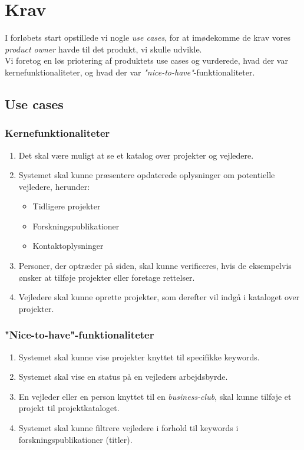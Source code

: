 \documentclass[12pt]{article}
\begin{document}
\section{Krav}
\label{sec:krav}
I forløbets start opstillede vi nogle \textit{use cases}, for at imødekomme de krav vores \textit{product owner} havde til det produkt, vi skulle udvikle. \\
Vi foretog en løs priotering af produktets use cases og vurderede, hvad der var kernefunktionaliteter, og hvad der var \textit{"nice-to-have"}-funktionaliteter.

\subsection*{Use cases}

\subsubsection{Kernefunktionaliteter}
\label{sec:corefuncs}
\begin{enumerate}
	\item Det skal være muligt at se et katalog over projekter og vejledere.
	\item Systemet skal kunne præsentere opdaterede oplysninger om potentielle vejledere, herunder:
	\begin{itemize}
		\item Tidligere projekter
		\item Forskningspublikationer
		\item Kontaktoplysninger
	\end{itemize}
	\item Personer, der optræder på siden, skal kunne verificeres, hvis de eksempelvis ønsker at tilføje projekter eller foretage rettelser.
	\item Vejledere skal kunne oprette projekter, som derefter vil indgå i kataloget over projekter.
\end{enumerate}

\subsubsection{"Nice-to-have"{}-funktionaliteter}
\label{sec:nicefuncs}
\begin{enumerate}
  \item Systemet skal kunne vise projekter knyttet til specifikke keywords.

  \item Systemet skal vise en status på en vejleders arbejdsbyrde.
  \item En vejleder eller en person knyttet til en \textit{business-club}, skal kunne tilføje et projekt til projektkataloget.

	\item Systemet skal kunne filtrere vejledere i forhold til keywords i forskningspublikationer (titler).
\end{enumerate}
\end{document}
